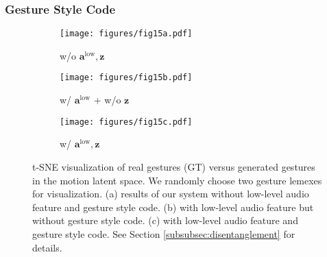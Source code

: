 \documentclass[acmtog,authorversion]{acmart}
\newcommand{\vect}[1]{\bm{#1}}
\newcommand{\eqword}[1]{{\text{#1}}}
\begin{document}
\subsubsection{Gesture Style Code}
\label{subsubsec:gesture_style_code}
\begin{figure}[t]
    \centering
    \begin{subfigure}[t]{0.32\linewidth}
        \centering
        \texttt{[image: figures/fig15a.pdf]}
        \caption{w/o $\vect{a}^{\eqword{low}},\vect{z}$}
        \label{fig:fig15a}
    \end{subfigure} 
    \hspace{\fill}
    \begin{subfigure}[t]{0.32\linewidth}
        \centering
        \texttt{[image: figures/fig15b.pdf]}
        \caption{w/ $\vect{a}^{\eqword{low}}$ + w/o $\vect{z}$}
        \label{fig:fig15b}
    \end{subfigure} 
    \hspace{\fill}
    \begin{subfigure}[t]{0.32\linewidth}
        \centering
        \texttt{[image: figures/fig15c.pdf]}
        \caption{w/ $\vect{a}^{\eqword{low}},\vect{z}$}
        \label{fig:fig15c}
    \end{subfigure} 
    \caption{t-SNE visualization of real gestures (GT) versus generated gestures in the motion latent space. We randomly choose two gesture lemexes for visualization.
    (a) results of our system without low-level audio feature and gesture style code.
    (b) with low-level audio feature but without gesture style code.
    (c) with low-level audio feature and gesture style code.
    See Section \ref{subsubsec:disentanglement} for details.}
    \label{fig:fig15}
    \Description{}
\end{figure}
\end{document}
